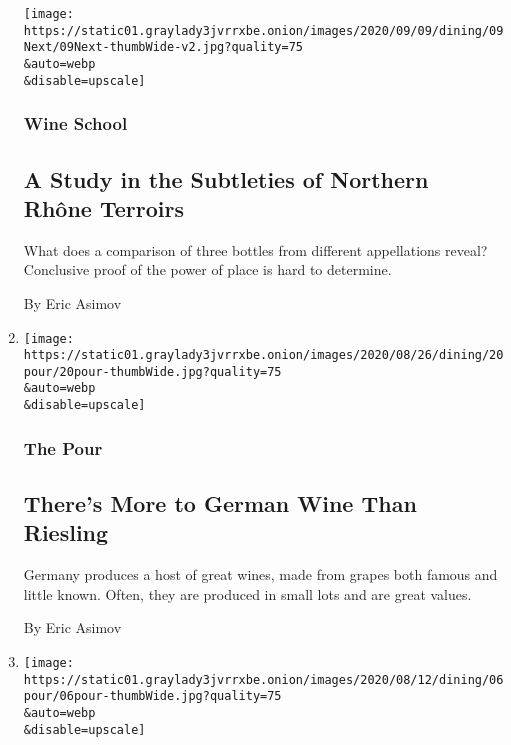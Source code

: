 \begin{enumerate}
  \texttt{[image: https://static01.graylady3jvrrxbe.onion/images/2020/09/09/dining/09Next/09Next-thumbWide-v2.jpg?quality=75\\\&auto=webp\\\&disable=upscale]}

  \hypertarget{wine-school-1}{%
  \subsubsection{Wine School}\label{wine-school-1}}

  \hypertarget{a-study-in-the-subtleties-of-northern-rhuxf4ne-terroirs}{%
  \subsection{A Study in the Subtleties of Northern Rhône
  Terroirs}\label{a-study-in-the-subtleties-of-northern-rhuxf4ne-terroirs}}

  What does a comparison of three bottles from different appellations
  reveal? Conclusive proof of the power of place is hard to determine.

  By Eric Asimov
\item
  \href{/2020/08/20/dining/drinks/german-wines.html}{}

  \texttt{[image: https://static01.graylady3jvrrxbe.onion/images/2020/08/26/dining/20pour/20pour-thumbWide.jpg?quality=75\\\&auto=webp\\\&disable=upscale]}

  \hypertarget{the-pour-1}{%
  \subsubsection{The Pour}\label{the-pour-1}}

  \hypertarget{theres-more-to-german-wine-than-riesling}{%
  \subsection{There's More to German Wine Than
  Riesling}\label{theres-more-to-german-wine-than-riesling}}

  Germany produces a host of great wines, made from grapes both famous
  and little known. Often, they are produced in small lots and are great
  values.

  By Eric Asimov
\item
  \href{/2020/08/06/dining/drinks/valentina-passalacqua-natural-wine-italy.html}{}

  \texttt{[image: https://static01.graylady3jvrrxbe.onion/images/2020/08/12/dining/06pour/06pour-thumbWide.jpg?quality=75\\\&auto=webp\\\&disable=upscale]}


\end{enumerate}
